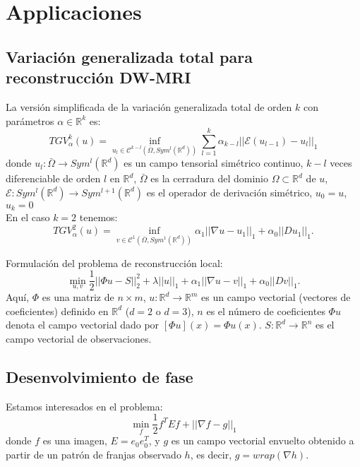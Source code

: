 \documentclass[12pt,draftcls, onecolumn, letterpaper,compsoc]{IEEEtran}
\begin{document}
\section{Applicaciones}
\subsection{Variaci\'{o}n generalizada total para reconstrucci\'{o}n DW-MRI}
La versi\'{o}n simplificada de la variaci\'{o}n generalizada total de orden $k$ con par\'{a}metros $\alpha \in \mathbb{R}^{k}$ es:
\begin{equation}
    TGV_{\alpha}^{k}(u)= \inf_{u_l \in \mathcal{C}^{k-l}(\bar{\Omega}, Sym^{l}(\mathbb{R}^{d}) )} \sum_{l=1}^{k} \alpha_{k-l}||\mathcal{E}(u_{l-1}) - u_{l}||_1
\end{equation}
donde $u_l:\bar{\Omega} \rightarrow Sym^{l}(\mathbb{R}^{d})$ es un campo tensorial sim\'{e}trico continuo, $k-l$ veces diferenciable de orden $l$ en $\mathbb{R}^{d}$, $\bar{\Omega}$ es la cerradura del dominio $\Omega \subset \mathbb{R}^{d}$ de $u$, $\mathcal{E}: Sym^{l}(\mathbb{R}^{d}) \rightarrow Sym^{l+1}(\mathbb{R}^{d})$ es el operador de derivaci\'{o}n sim\'{e}trico, $u_0 = u$, $u_k = 0$\\

En el caso $k=2$ tenemos:
\begin{equation}
    TGV_{\alpha}^{2}(u)= \inf_{v \in \mathcal{C}^{1}(\bar{\Omega}, Sym^{1}(\mathbb{R}^{d}) )} \alpha_{1}||\nabla u - u_{1}||_{1} + \alpha_{0}||D u_{1}||_{1}.
\end{equation}

Formulaci\'{o}n del problema de reconstrucci\'{o}n local:
\begin{equation}
    \min_{u, v} \frac{1}{2}||\Phi u - S||_{2}^{2} + \lambda ||u||_1 + \alpha_{1}||\nabla u - v||_{1} + \alpha_{0}||D v||_{1}.
\end{equation}
Aqu\'{i}, $\Phi$ es una matriz de $n\times m$,  $u:\mathbb{R}^{d} \rightarrow \mathbb{R}^{m}$ es un campo vectorial (vectores de coeficientes) definido en $\mathbb{R}^{d}$ ($d=2$ o $d=3$), $n$ es el n\'{u}mero de coeficientes $\Phi u$ denota el campo vectorial dado por $\left[\Phi u\right] (x) = \Phi u(x)$. $S:\mathbb{R}^{d} \rightarrow \mathbb{R}^{n}$ es el campo vectorial de observaciones.

\subsection{Desenvolvimiento de fase}
Estamos interesados en el problema:
\begin{equation}
    \min_{f} \frac{1}{2}f^{T}Ef + ||\nabla f - g||_1
\end{equation}
donde $f$ es una imagen, $E = e_{0}e_{0}^{T}$, y $g$ es un campo vectorial envuelto obtenido a partir de un patr\'{o}n de franjas observado $h$, es decir, $g=wrap(\nabla h)$.\\
\end{document}
